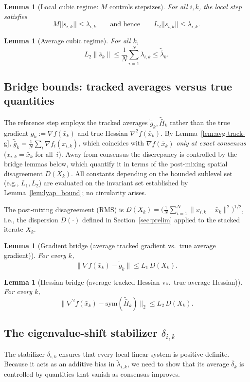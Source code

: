 \documentclass[11pt,a4paper]{article}
\def\norm#1{||#1||}%
\newtheorem{lemma}[theorem]{Lemma}
\newcommand{\norm}[1]{\left\|#1\right\|}
\begin{document}
\begin{lemma}[Local cubic regime: $M$ controls stepsizes]\label{lem:M-vs-s}
For all $i,k$, the local step satisfies
\[
M\norm{s_{i,k}}\le \lambda_{i,k}
\qquad\text{and hence}\qquad
L_2\norm{s_{i,k}}\le \lambda_{i,k}.
\]
\end{lemma}

\begin{lemma}[Average cubic regime]\label{lem:avg-regime}
For all $k$,
\[
L_2\|\bar s_k\|\le \frac1N\sum_{i=1}^N \lambda_{i,k}\le \tilde{\bar\lambda}_k.
\]
\end{lemma}

\subsection{Bridge bounds: tracked averages versus true quantities}\label{ssec:bridge}
The reference step employs the tracked averages
$\tilde{\bar g}_k,\tilde{\bar H}_k$ rather than the true gradient
$g_k:=\nabla f(\bar x_k)$ and true Hessian
$\nabla^2 f(\bar x_k)$.
By Lemma~\ref{lem:avg-track-g},
$\tilde{\bar g}_k = \frac{1}{N}\sum_{i}\nabla f_i(x_{i,k})$,
which coincides with $\nabla f(\bar x_k)$ \emph{only at exact
consensus} ($x_{i,k}=\bar x_k$ for all~$i$).
Away from consensus the discrepancy is controlled by the
bridge lemmas below, which quantify it in terms of the
post-mixing spatial disagreement $D(X_k)$.
All constants depending on the bounded sublevel set
(e.g., $L_1,L_2$) are evaluated on the invariant set
established by Lemma~\ref{lem:lyap_bound}; no circularity arises.

The post-mixing disagreement (RMS) is
$D(X_k)=\bigl(\frac1N\sum_{i=1}^N \|x_{i,k}-\bar x_k\|^2\bigr)^{1/2}$,
i.e., the dispersion $D(\cdot)$ defined in Section~\ref{sec:prelim}
applied to the stacked iterate $X_k$.

\begin{lemma}[Gradient bridge (average tracked gradient vs.\ true average gradient)]\label{lem:bridge-grad}
For every $k$,
\[
\|\nabla f(\bar x_k)-\tilde{\bar g}_k\|\le L_1\,D(X_k).
\]
\end{lemma}

\begin{lemma}[Hessian bridge (average tracked Hessian vs.\ true average Hessian)]\label{lem:bridge-hess}
For every $k$,
\[
\|\nabla^2 f(\bar x_k)-\mathrm{sym}(\tilde{\bar H}_k)\|_2\le L_2\,D(X_k).
\]
\end{lemma}

\subsection{The eigenvalue-shift stabilizer \texorpdfstring{$\delta_{i,k}$}{delta\_ik}}\label{ssec:stab}
The stabilizer $\delta_{i,k}$ ensures that every local linear system
is positive definite.
Because it acts as an additive bias in $\tilde\lambda_{i,k}$, we need
to show that its average $\bar\delta_k$ is controlled by quantities
that vanish as consensus improves.
\end{document}
